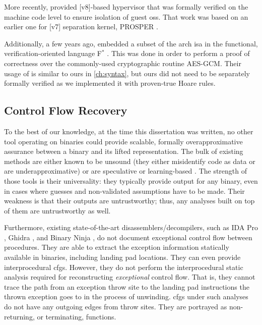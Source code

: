 More recently, \textcite{baumann2016high} provided [v8]-based hypervisor that was formally verified on the machine code level to ensure isolation of guest \acp{os}.
That work was based on an earlier one for [v7] separation kernel, PROSPER \autocite{dam2013hypervisor,dam2013formal}.

Additionally, a few years ago, \textcite{fromherz2019verified} embedded a subset of the \gls{arch} \ac{isa} in the functional, verification-oriented language F$^*$ \autocite{fstar}.
This was done in order to perform a proof of correctness over the commonly-used cryptographic routine AES-GCM.
Their usage of  is similar to ours in \cref{ch:syntax}, but ours did not need to be separately formally verified as we implemented it with proven-true Hoare rules.

\subsection{Control Flow Recovery}
To the best of our knowledge, at the time this dissertation was written, no other tool operating on binaries could provide scalable, formally overapproximative assurance between a binary and its lifted representation.
The bulk of existing methods are either known to be unsound (they either  misidentify code as data or are underapproximative) \autocite{schwartz2002disassembly} or are speculative or learning-based \autocite{wartell2011differentiating,khadra2016speculative}.
The strength of those tools is their universality: they typically provide output for any binary, even in cases where guesses and non-validated assumptions have to be made.
Their weakness is that their outputs are untrustworthy; thus, any analyses built on top of them are untrustworthy as well.

Furthermore, existing state-of-the-art disassemblers/decompilers, such as IDA Pro \autocite{ida}, Ghidra \autocite{ghidra}, and Binary Ninja \autocite{binary-ninja}, do not document exceptional control flow between procedures.
They are able to extract the exception information statically available in binaries, including landing pad locations.
They can even provide interprocedural \acp{cfg}.
However, they do not perform the interprocedural static analysis required for reconstructing \emph{exceptional} control flow.
That is, they cannot trace the path from an exception throw site to the landing pad instructions the thrown exception goes to in the process of unwinding.
\Acp{cfg} under such analyses do not have any outgoing edges from throw sites.
They are portrayed as non-returning, or terminating, functions.

